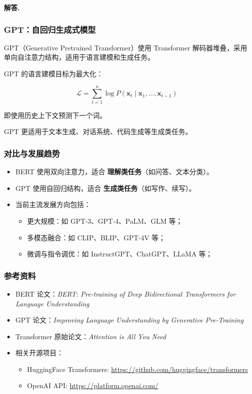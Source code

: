\documentclass[12pt, a4paper, oneside]{ctexart}
\numberwithin{equation}{section}  %
\newenvironment{solution}[1][]{\par\noindent\textbf{#1解答. }}{\smallskip\par}  %
\begin{document}
\begin{solution}
\subsubsection*{GPT：自回归生成式模型}

GPT（Generative Pretrained Transformer）使用 Transformer 解码器堆叠，采用单向自注意力结构，适用于语言建模和生成任务。

GPT 的语言建模目标为最大化：

\[
\mathcal{L} = \sum_{t=1}^{n} \log P(\boldsymbol{x}_t \mid \boldsymbol{x}_1, \dots, \boldsymbol{x}_{t-1})
\]

即使用历史上下文预测下一个词。

GPT 更适用于文本生成、对话系统、代码生成等生成类任务。

\subsubsection*{对比与发展趋势}

\begin{itemize}
  \item BERT 使用双向注意力，适合 \textbf{理解类任务}（如问答、文本分类）。
  \item GPT 使用自回归结构，适合 \textbf{生成类任务}（如写作、续写）。
  \item 当前主流发展方向包括：
  \begin{itemize}
    \item 更大规模：如 GPT-3、GPT-4、PaLM、GLM 等；
    \item 多模态融合：如 CLIP、BLIP、GPT-4V 等；
    \item 微调与指令调优：如 InstructGPT、ChatGPT、LLaMA 等；
  \end{itemize}
\end{itemize}

\subsubsection*{参考资料}

\begin{itemize}
  \item BERT 论文：\textit{BERT: Pre-training of Deep Bidirectional Transformers for Language Understanding}
  \item GPT 论文：\textit{Improving Language Understanding by Generative Pre-Training}
  \item Transformer 原始论文：\textit{Attention is All You Need}
  \item 相关开源项目：
  \begin{itemize}
    \item HuggingFace Transformers: \url{https://github.com/huggingface/transformers}
    \item OpenAI API: \url{https://platform.openai.com/}
  \end{itemize}
\end{itemize}

\end{solution}
\end{document}
